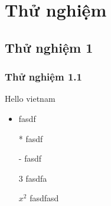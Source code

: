 \chapter{Thử nghiệm}

\section{Thử nghiệm 1}
\subsection{Thử nghiệm 1.1}

\begin{defivn} 
\end{defivn}

\begin{theovn}
Hello vietnam
\end{theovn}

\begin{egvn}
\end{egvn}

\begin{lemmavn}
\end{lemmavn}

\begin{corollaryvn}
\end{corollaryvn}

\begin{proofvn}
\end{proofvn}

\begin{probvn}
\end{probvn}

\begin{itemize}
    \item fasdf
    \item[*] fasdf
    \item[-] fasdf
    \item[3] fasdfa
    \item[$x^2$] fasdfasd
\end{itemize}
